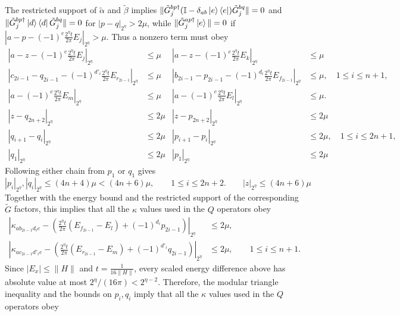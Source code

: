 \documentclass[aps,floatfix,10pt,amssymb,amsfont,amsmath,superscriptaddress,float,nofootinbib,longbibliography,nobalancelastpage,twocolumn]{revtex4-2}
\begin{document}
The restricted support of $\tilde\alpha$ and $\tilde\beta$ implies
$\|\tilde G^{bp\dagger}_{j}(\mathbb{I} - \delta_{ab}\ket{e}\bra{e})\tilde G^{bq}_{j}\| = 0$ and
$\|\tilde G^{bp\dagger}_{j}\ket{d}\bra{d}\tilde G^{bq}_{j}\| = 0$
for $|p-q|_{2^{\eta}} > 2\mu$, while
$\|\tilde G^{ap \dagger}_j \ket{e}\| = 0$ if
$|a-p-(-1)^e\frac{2^{\eta}t}{2\pi}E_j|_{2^\eta}>\mu$.  Thus a nonzero
term must obey
\begin{equation}
\begin{aligned}
    |a-z-(-1)^e\tfrac{2^{\eta}t}{2\pi}E_j|_{2^{\eta}} &\leq \mu
    &|a-z-(-1)^e\tfrac{2^{\eta}t}{2\pi}E_k|_{2^{\eta}} &\leq \mu\\
    |c_{2i-1}-q_{2i-1}-(-1)^{d'_i}\tfrac{2^{\eta}t}{2\pi}E_{r_{2i-1}}|_{2^{\eta}} &\leq \mu
    &|b_{2i-1}-p_{2i-1}-(-1)^{d_i}\tfrac{2^{\eta}t}{2\pi}E_{f_{2i-1}}|_{2^{\eta}} &\leq \mu,
    \quad 1\leq i\leq n+1,\\
    |a-(-1)^{e}\tfrac{2^{\eta}t}{2\pi}E_m|_{2^{\eta}} &\leq \mu
    &|a-(-1)^{e}\tfrac{2^{\eta}t}{2\pi}E_l|_{2^{\eta}}& \leq \mu.\\
        |z-q_{2n+2}|_{2^{\eta}} &\leq 2\mu & |z-p_{2n+2}|_{2^{\eta}} &\leq 2\mu\\
    |q_{i+1}-q_i|_{2^{\eta}} &\leq 2\mu
    &|p_{i+1}-p_i|_{2^{\eta}} &\leq 2\mu,\quad 1\leq i\leq2n+1,\\
    |q_1|_{2^{\eta}} &\leq 2\mu & |p_1|_{2^{\eta}} &\leq 2\mu
\end{aligned}
\label{eq:conjE}
\end{equation}
Following either chain from $p_1$ or $q_1$ gives
\begin{equation}
    |p_i|_{2^{\eta}},|q_i|_{2^{\eta}} \leq (4n+4)\mu < (4n+6)\mu,
    \qquad 1\leq i\leq 2n+2. \qquad |z|_{2^{\eta}} \leq (4n+6)\mu
\end{equation}
Together with the energy bound and the restricted support of the corresponding $\tilde G$ factors, this implies that all the $\kappa$ values used in the $Q$ operators obey
\begin{align}
    \left|\kappa_{ab_{2i-1}d_i e}-\left(\tfrac{2^{\eta}t}{2\pi}(E_{f_{2i-1}}-E_l)+(-1)^{d_i}p_{2i-1}\right)\right|_{2^{\eta}}&\leq 2\mu,\\
    \left|\kappa_{ac_{2i-1}d'_i e}-\left(\tfrac{2^{\eta}t}{2\pi}(E_{r_{2i-1}}-E_m)+(-1)^{d'_i}q_{2i-1}\right)\right|_{2^{\eta}}&\leq 2\mu,
    \qquad 1\leq i\leq n+1.
\end{align}
Since $|E_x|\leq\|H\|$ and $t=\frac{1}{16\|H\|}$, every scaled energy difference above has absolute value at most $2^{\eta}/(16\pi)<2^{\eta-2}$. Therefore, the modular triangle inequality and the bounds on $p_i,q_i$ imply that all the $\kappa$ values used in the $Q$ operators obey
\end{document}
